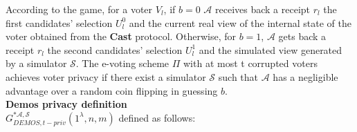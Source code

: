 \documentclass[12pt]{article}
\begin{document}
 According to the game, for a voter $V_l$, if $b = 0$ $\mathcal{A}$ receives back a receipt $r_l$ the first candidates' selection $U_l^0$ and the current real view of the internal state of the voter obtained from the \textbf{Cast} protocol. Otherwise, for $b = 1$,  $\mathcal{A}$ gets back a receipt $r_l$ the second candidates' selection $U_l^1$ and the simulated view generated by a simulator $\mathcal{S}$. The e-voting scheme $\Pi$ with at most t corrupted voters achieves voter privacy if there exist a simulator $\mathcal{S}$ such that $\mathcal{A}$  has a negligible advantage over a random coin flipping in guessing $b$.\\
 
 \textbf{Demos privacy definition}\\
 $G_{DEMOS,t-priv}^{*\mathcal{A}, \mathcal{S}}(1^{\lambda},n,m)$ defined as follows:\\
  
\end{document}
